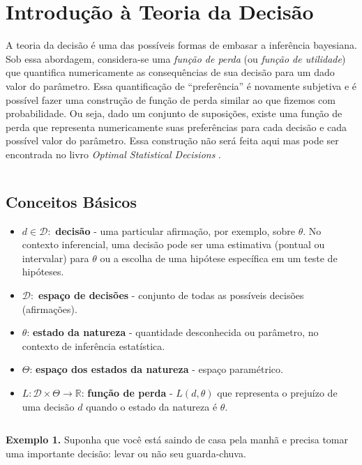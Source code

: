 \documentclass[
]{book}
\begin{document}
\(~\)

\hypertarget{TeoDec}{%
\chapter{Introdução à Teoria da Decisão}\label{TeoDec}}

A teoria da decisão é uma das possíveis formas de embasar a inferência bayesiana. Sob essa abordagem, considera-se uma \emph{função de perda} (ou \emph{função de utilidade}) que quantifica numericamente as consequências de sua decisão para um dado valor do parâmetro. Essa quantificação de ``preferência'' é novamente subjetiva e é possível fazer uma construção de função de perda similar ao que fizemos com probabilidade. Ou seja, dado um conjunto de suposições, existe uma função de perda que representa numericamente suas preferências para cada decisão e cada possível valor do parâmetro. Essa construção não será feita aqui mas pode ser encontrada no livro \emph{Optimal Statistical Decisions} \citep{DeGroot70}.

\(~\)

\hypertarget{BasDec}{%
\section{Conceitos Básicos}\label{BasDec}}

\begin{itemize}
\item
  \(d \in \mathcal{D}:\) \textbf{decisão} - uma particular afirmação, por exemplo, sobre \(\theta\). No contexto inferencial, uma decisão pode ser uma estimativa (pontual ou intervalar) para \(\theta\) ou a escolha de uma hipótese específica em um teste de hipóteses.
\item
  \(\mathcal{D}:\) \textbf{espaço de decisões} - conjunto de todas as possíveis decisões (afirmações).
\item
  \(\theta\): \textbf{estado da natureza} - quantidade desconhecida ou parâmetro, no contexto de inferência estatística.
\item
  \(\Theta\): \textbf{espaço dos estados da natureza} - espaço paramétrico.
\item
  \(L:\mathcal{D}\times\Theta\longrightarrow\mathbb{R}\): \textbf{função de perda} - \(L(d,\theta)\) que representa o prejuízo de uma decisão \(d\) quando o estado da natureza é \(\theta\).
\end{itemize}

\(~\)

\textbf{Exemplo 1.}
Suponha que você está saindo de casa pela manhã e precisa tomar uma importante decisão: levar ou não seu guarda-chuva.
\end{document}
